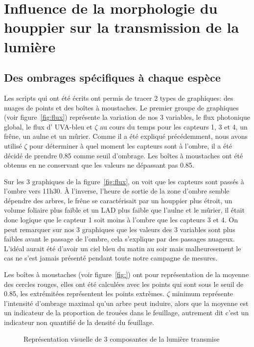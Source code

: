 ﻿\documentclass[12pt]{report}
\begin{document}
\section{Influence de la morphologie du houppier sur la transmission de la lumière}

\subsection{Des ombrages spécifiques à chaque espèce}

Les scripts qui ont été écrits ont permis de tracer 2 types de graphiques: des
nuages de points et des boîtes à moustaches. Le premier groupe de graphiques
(voir figure~\ref{fig:flux}) représente la variation de nos 3 variables, le flux
photonique global, le flux d' UVA-bleu et $\zeta$ au cours du temps pour les capteurs
1, 3 et 4, un frêne, un aulne et un mûrier. Comme il a été expliqué précédemment,
nous avons utilisé $\zeta$ pour déterminer à quel moment les capteurs sont à
l'ombre, il a été décidé de prendre 0.85 comme seuil d'ombrage. Les boîtes à
moustaches ont été obtenus en ne conservant que les valeurs ne dépassant pas
0.85.

Sur les 3 graphiques de la figure~\ref{fig:flux}, on voit que les capteurs sont
passés à l'ombre vers 11h30. À l'inverse, l'heure de sortie de la zone d'ombre
semble dépendre des arbres, le frêne se caractérisait par un houppier plus
étroit, un volume foliaire plus faible et un LAD plus faible que l'aulne et le
mûrier, il était donc logique que le capteur 1 soit moins à l'ombre que les
capteurs 3 et 4. On peut remarquer sur nos 3 graphiques que les valeurs des 3
variables sont plus faibles avant le passage de l'ombre, cela s'explique par des
passages nuageux. L'idéal aurait été d'avoir un ciel bleu du matin au soir mais
malheuresement le cas ne s'est jamais présenté pendant toute notre campagne de
mesures.

Les boîtes à moustaches (voir figure~\ref{fig:}) ont pour représentation de la
moyenne des cercles rouges, elles ont été calculées avec les points qui sont
sous le seuil de 0.85, les extrémitées représentent les points extrèmes. $\zeta$
minimum représente l'intensité d'ombrage maximal qu'un arbre peut induire, alors
que la moyenne est un indicateur de la proportion de trouées dans le feuillage,
autrement dit c'est un indicateur non quantifié de la densité du feuillage.

\begin{figure}
  \centering
  \begin{tiny}
    
  \end{tiny}
  \caption{Représentation visuelle de 3 composantes de la lumière transmise\label{fig:bozo}}
\end{figure}
\end{document}
